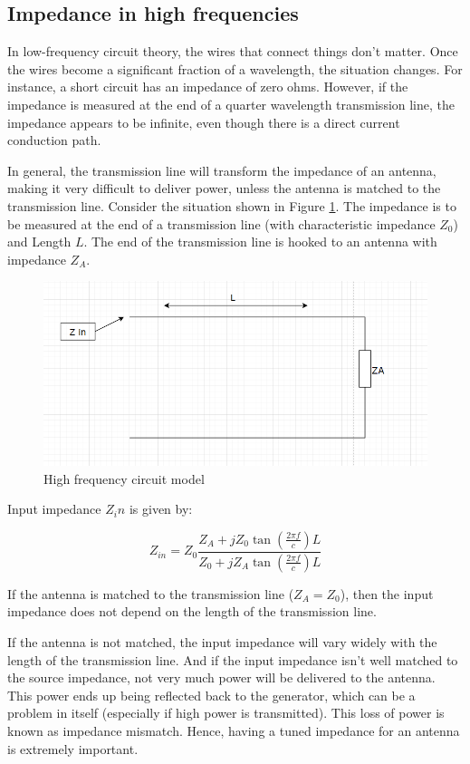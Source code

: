 \documentclass[a4paper,12pt]{report}
\begin{document}
\subsection{Impedance in high frequencies}

In low-frequency circuit theory, the wires that connect things don't matter.
Once the wires become a significant fraction of a wavelength,
the situation changes. For instance,
a short circuit has an impedance of zero ohms. However,
if the impedance is measured at the end of a quarter wavelength transmission line,
the impedance appears to be infinite,
even though there is a direct current conduction path.

In general, the transmission line will transform the impedance of an antenna,
making it very difficult to deliver power,
unless the antenna is matched to the transmission line.
Consider the situation shown in Figure \ref{fig:high_freq_circuit_diagram}.
The impedance is to be measured at the end of a transmission line
(with characteristic impedance $Z_0$) and Length $L$.
The end of the transmission line is hooked to an antenna with impedance $Z_A$.

\begin{figure}
  \begin{center}
    \includegraphics[clip, keepaspectratio, width=0.5\linewidth]{img/high_freq_circuit_diagram.png}
    \caption{High frequency circuit model}
    \label{fig:high_freq_circuit_diagram}
  \end{center}
\end{figure}

Input impedance $Z_in$ is given by:

\begin{equation}
  Z_{in} = Z_0 \frac{Z_A + j Z_0 \tan(\frac{2\pi f}{c}) L}{Z_0 + j Z_A \tan(\frac{2\pi f}{c}) L}
\end{equation}

If the antenna is matched to the transmission line ($Z_A=Z_0$),
then the input impedance does not depend on the length of the transmission line.

If the antenna is not matched,
the input impedance will vary widely with the length of the transmission line.
And if the input impedance isn't well matched to the source impedance,
not very much power will be delivered to the antenna.
This power ends up being reflected back to the generator,
which can be a problem in itself (especially if high power is transmitted).
This loss of power is known as impedance mismatch.
Hence, having a tuned impedance for an antenna is extremely important.
\end{document}
